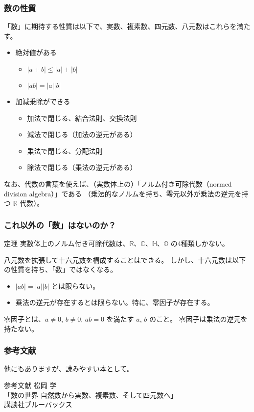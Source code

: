 \documentclass{beamer}
\begin{document}
\begin{frame}
    \frametitle{数の性質}

    「数」に期待する性質は以下で、実数、複素数、四元数、八元数はこれらを満たす。

    \begin{itemize}
        \item 絶対値がある
              \begin{itemize}
                  \item \(|a + b| \leq |a| + |b|\)
                  \item \(|ab| = |a||b|\)
              \end{itemize}
        \item 加減乗除ができる
              \begin{itemize}
                  \item 加法で閉じる、結合法則、交換法則
                  \item 減法で閉じる（加法の逆元がある）
                  \item 乗法で閉じる、分配法則
                  \item 除法で閉じる（乗法の逆元がある）
              \end{itemize}
    \end{itemize}

    なお、代数の言葉を使えば、（実数体上の）「ノルム付き可除代数（normed division algebra）」である
    （乗法的なノルムを持ち、零元以外が乗法の逆元を持つ \(\mathbb{R}\) 代数）。
\end{frame}

\begin{frame}
    \frametitle{これ以外の「数」はないのか？}

    \begin{block}{定理}
        実数体上のノルム付き可除代数は、\(\mathbb{R}\)、\(\mathbb{C}\)、\(\mathbb{H}\)、\(\mathbb{O}\) の4種類しかない。
    \end{block}

    八元数を拡張して十六元数を構成することはできる。
    しかし、十六元数は以下の性質を持ち、「数」ではなくなる。

    \begin{itemize}
        \item \(|ab| = |a||b|\) とは限らない。
        \item 乗法の逆元が存在するとは限らない。特に、零因子が存在する。
    \end{itemize}

    零因子とは、\(a \neq 0\), \(b \neq 0\), \(ab = 0\) を満たす \(a\), \(b\) のこと。
    零因子は乗法の逆元を持たない。

\end{frame}

\begin{frame}
    \frametitle{参考文献}

    他にもありますが、読みやすい本として。

    \begin{block}{参考文献}
        松岡 学 \\
        「数の世界 自然数から実数、複素数、そして四元数へ」 \\
        講談社ブルーバックス
    \end{block}
\end{frame}
\end{document}
